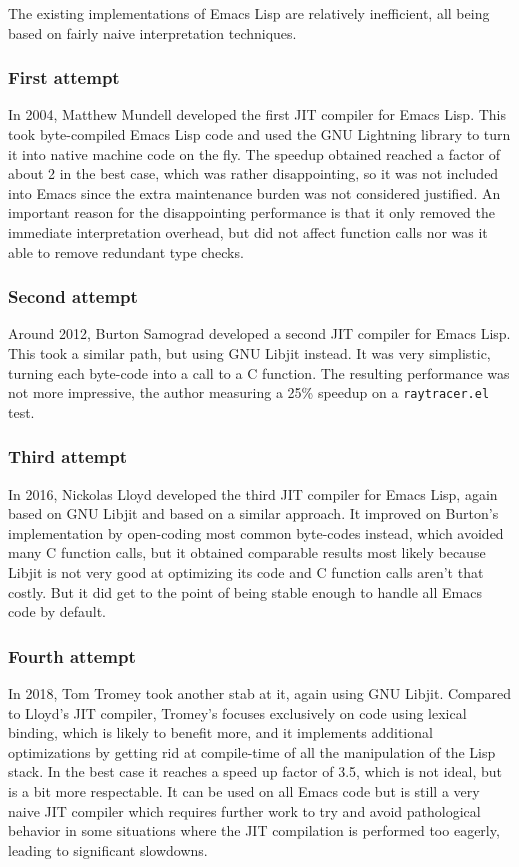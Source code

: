 \documentclass[format=acmsmall, review]{acmart}
\newcommand \Elisp {Emacs Lisp}
\begin{document}
The existing implementations of \Elisp{} are relatively inefficient, all
being based on fairly naive interpretation techniques.

\subsubsection{First attempt}
In 2004, Matthew Mundell developed the first JIT compiler for \Elisp.
This took byte-compiled \Elisp{} code and used the GNU Lightning library to
turn it into native machine code on the fly.
The speedup obtained reached a factor of about 2 in the best case, which
was rather disappointing, so it was not included into Emacs since the extra
maintenance burden was not considered justified.
An important reason for the disappointing performance is that it only
removed the immediate interpretation overhead, but did not affect function
calls nor was it able to remove redundant type checks.

\subsubsection{Second attempt}
Around 2012, Burton Samograd developed a second JIT compiler for \Elisp.
This took a similar path, but using GNU Libjit instead.  It was very
simplistic, turning each byte-code into a call to a C function.
The resulting performance was not more impressive, the author measuring
a 25\% speedup on a \texttt{raytracer.el} test.

\subsubsection{Third attempt}
In 2016, Nickolas Lloyd developed the third JIT compiler for \Elisp, again
based on GNU Libjit and based on a similar approach.  It improved on
Burton's implementation by open-coding most common byte-codes instead, which
avoided many C function calls, but it obtained comparable results most
likely because Libjit is not very good at optimizing its code and C function
calls aren't that costly.  But it did get to the point of being stable enough
to handle all Emacs code by default.

\subsubsection{Fourth attempt}
In 2018, Tom Tromey took another stab at it, again using GNU Libjit.
Compared to Lloyd's JIT compiler, Tromey's focuses exclusively on code using lexical binding,
which is likely to benefit more, and it implements additional optimizations
by getting rid at compile-time of all the manipulation of the Lisp stack.
In the best case it reaches a speed up factor of 3.5, which is not ideal,
but is a bit more respectable.  It can be used on all Emacs code but is still
a very naive JIT compiler which requires further work to try and avoid
pathological behavior in some situations where the JIT compilation is
performed too eagerly, leading to significant slowdowns.
\end{document}
